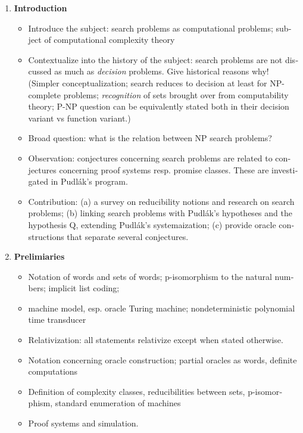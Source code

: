 \documentclass[nofonts]{uebung}
\begin{document}
\begin{english}
\begin{enumerate}[label*=\arabic*.]
    \item \textbf{Introduction}
        \begin{itemize}
            \item Introduce the subject: search problems as computational problems; subject of computational complexity theory
            \item Contextualize into the history of the subject: search problems are not discussed as much as \emph{decision} problems. Give historical reasons why! (Simpler conceptualization; search reduces to decision at least for NP-complete problems; \emph{recognition} of sets brought over from computability theory; P-NP question can be equivalently stated both in their decision variant vs function variant.)
            \item Broad question: what is the relation between NP search problems?
            \item Observation: conjectures concerning search problems are related to conjectures concerning proof systems resp. promise classes. These are investigated in Pudlák's program.
            \item Contribution: (a) a survey on reducibility notions and research on search problems; (b) linking search problems with Pudlák's hypotheses and the hypothesis Q, extending Pudlák's systemaization; (c) provide oracle constructions that separate several conjectures.
        \end{itemize}
    \item \textbf{Prelimiaries}
        \begin{itemize}
            \item Notation of words and sets of words; p-isomorphism to the natural numbers; implicit list coding; 
            \item machine model, esp. oracle Turing machine; nondeterministic polynomial time transducer
            \item Relativization: all statements relativize except when stated otherwise.
            \item Notation concerning oracle construction; partial oracles as words, definite computations
            \item Definition of complexity classes, reducibilities between sets,  p-isomorphism, standard enumeration of machines
            \item Proof systems and simulation.
        \end{itemize}

\end{enumerate}
\end{english}
\end{document}
